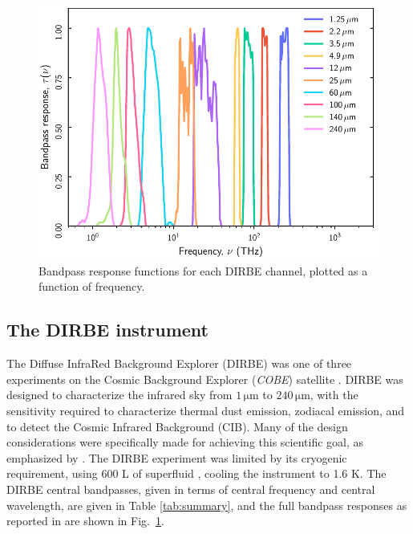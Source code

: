 \documentclass{aa}
\def\COBE{\textit{COBE}}
\begin{document}
\begin{figure}
  \centering
  \includegraphics[width=\linewidth]{figs/DIRBE_bp.pdf}
  \caption{Bandpass response functions for each DIRBE channel, plotted as a function of frequency.}
  \label{fig:bandpass}
\end{figure}


\subsection{The DIRBE instrument}

The Diffuse InfraRed Background Explorer (DIRBE) was one of three experiments on the Cosmic Background Explorer (\COBE) satellite \citep{boggess92}. DIRBE was designed to characterize the infrared sky from $1\,\mathrm{\mu m}$ to $240\,\mathrm{\mu m}$, with the sensitivity required to characterize thermal dust emission, zodiacal emission, and to detect the Cosmic Infrared Background (CIB). Many of the design considerations were specifically made for achieving this scientific goal, as emphasized by \citet{silverberg93}. The DIRBE experiment was limited by its cryogenic requirement, using 600 L of superfluid , cooling the instrument to 1.6 K.
The DIRBE central bandpasses, given in terms of central frequency and central wavelength, are given in Table \ref{tab:summary}, and the full bandpass responses as reported in \citet{cobe_exsupp} are shown in Fig.~\ref{fig:bandpass}.
\end{document}
